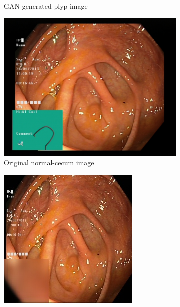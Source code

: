 \begin{figure}
\begin{subfigure}[t]{\myfigsizethree}
            \caption{GAN generated plyp image}    
            \label{fig:polyp_GAN_SQUARE2}
        \end{subfigure}
        \qquad\vfill%
        \begin{subfigure}[t]{\myfigsizethree}   
            \centering 
            \includegraphics[height=\textwidth, width=\textwidth]{experiments/figures/greensquare/ncORIG.jpg}
            \caption{Original normal-cecum image}   
            \label{fig:nc_ORIG_SQUARE2}
        \end{subfigure}
        \qquad
        \begin{subfigure}[t]{\myfigsizethree}   
            \centering 
            \includegraphics[width=\textwidth]{experiments/figures/greensquare/ncAE.jpg}

\end{subfigure}
\end{figure}
